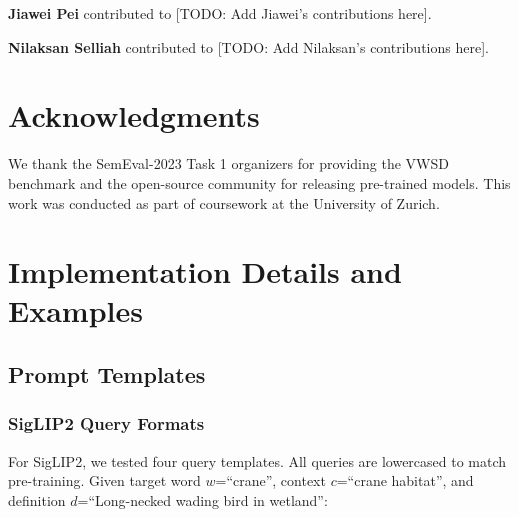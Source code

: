 \documentclass[11pt]{article}
\begin{document}
\textbf{Jiawei Pei} contributed to [TODO: Add Jiawei's contributions here].

\textbf{Nilaksan Selliah} contributed to [TODO: Add Nilaksan's contributions here].

\section*{Acknowledgments}

We thank the SemEval-2023 Task 1 organizers for providing the VWSD benchmark and the open-source community for releasing pre-trained models. This work was conducted as part of coursework at the University of Zurich.

%


\appendix

\section{Implementation Details and Examples}
\label{sec:appendix}

\subsection{Prompt Templates}

\subsubsection{SigLIP2 Query Formats}

For SigLIP2, we tested four query templates. All queries are lowercased to match pre-training. Given target word $w$=``crane'', context $c$=``crane habitat'', and definition $d$=``Long-necked wading bird in wetland'':
\end{document}
